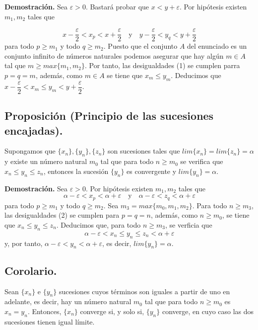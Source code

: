\documentclass[10pt,a4paper]{article}
\begin{document}
	\textbf{Demostración.} Sea $\varepsilon > 0$. Bastará probar que $x < y + \varepsilon$. Por hipótesis existen $m_1, m_2$ tales que 
	
	\begin{equation}
		x- \dfrac{\varepsilon}{2} < x_p < x + \dfrac{\varepsilon}{2} \quad \text{y} \quad y - \dfrac{\varepsilon}{2} < y_q < y + \dfrac{\varepsilon}{2}
	\end{equation}
	para todo $p \geq m_1$ y todo $q \geq m_2$. Puesto que el conjunto $A$ del enunciado es un conjunto infinito de números naturales podemos asegurar que hay algún $m \in A$ tal que $m \geq max\{m_1, m_2\}$. Por tanto, las desigualdades (1) se cumplen parra $p = q = m$, además, como $m \in A$ se tiene que $x_m \leq y_m$. Deducimos que $x - \dfrac{\varepsilon}{2} < x_m \leq y_m < y + \dfrac{\varepsilon}{2}$.
	
	\subsection{Proposición (Principio de las sucesiones encajadas).}
	Supongamos que $\{x_n\}, \{y_n\}, \{z_n\}$ son sucesiones tales que $lim\{x_n\} = lim\{z_n\} = \alpha$ y existe un número natural $m_0$ tal que para todo $n \geq m_0$ se verifica que $x_n \leq y_n \leq z_n$, entonces la sucesión $\{y_n\}$ es convergente y $lim\{y_n\} = \alpha$.
	
	\textbf{Demostración.} Sea $\varepsilon > 0$. Por hipótesis existen $m_1, m_2$ tales que 
	\begin{equation}
		\alpha - \varepsilon < x_p < \alpha + \varepsilon \quad \text{y} \quad \alpha - \varepsilon < z_q < \alpha+ \varepsilon
	\end{equation}
	para todo $p \geq m_1$ y todo $q \geq m_2$. Sea $m_3 = max\{m_0, m_1, m_2\}$. Para todo $n \geq m_3$, las desigualdades (2) se cumplen para $p = q = n$, además, como $n \geq m_0$, se tiene que $x_n \leq y_n \leq z_n$. Deducimos que, para todo $n \geq m_3$, se verficia que $$ \alpha - \varepsilon < x_n \leq y_n \leq z_n < \alpha + \varepsilon$$
	y, por tanto, $\alpha - \varepsilon < y_n < \alpha + \varepsilon$, es decir, $lim\{y_n\} = \alpha$.
	
	\subsection{Corolario.}
	Sean $\{x_n\}$ e $\{y_n\}$ sucesiones cuyos términos son iguales a partir de uno en adelante, es decir, hay un número natural $m_0$ tal que para todo $n \geq m_0$ es $x_n = y_n$. Entonces, $\{x_n\}$ converge si, y solo si, $\{y_n\}$ converge, en cuyo caso las dos sucesiones tienen igual límite.
	
\end{document}
